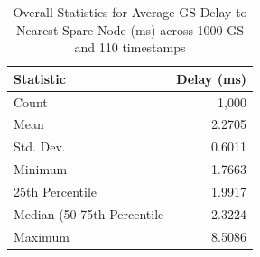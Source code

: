 \begin{table}[htbp]
\centering
\caption{Overall Statistics for Average GS Delay to Nearest Spare Node (ms) across 1000 GS and 110 timestamps}
\label{tab:gs_delay_overall_avg_per_gs}
\begin{tabular}{lr}
\toprule
Statistic & Delay (ms) \\
\midrule
Count & 1,000 \\
Mean & 2.2705 \\
Std. Dev. & 0.6011 \\
Minimum & 1.7663 \\
25th Percentile & 1.9917 \\
Median (50%
75th Percentile & 2.3224 \\
Maximum & 8.5086 \\
\bottomrule
\end{tabular}
\end{table}

